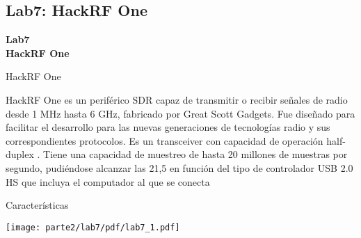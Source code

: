 \subsection{Lab7: HackRF One}
\begin{frame}{}


\bfseries{\textrm{\LARGE Lab7\\ \Large HackRF One}}
\raggedright
\end{frame}

\begin{frame}{HackRF One}



HackRF One es un periférico SDR capaz de transmitir o recibir señales de radio desde 1 MHz hasta 6 GHz, fabricado por Great Scott Gadgets. Fue diseñado para facilitar el  desarrollo para las nuevas generaciones de tecnologías radio y sus correspondientes protocolos. Es un transceiver con capacidad de operación half-duplex .  Tiene una capacidad de muestreo de hasta 20 millones de muestras por segundo, pudiéndose alcanzar las 21,5 en función del tipo de controlador USB 2.0 HS que incluya el computador al que se conecta

\end{frame}

\begin{frame}{Características}

\begin{center}
\vspace{-0.3cm}
\texttt{[image: parte2/lab7/pdf/lab7\_1.pdf]}
\end{center}

\end{frame}

